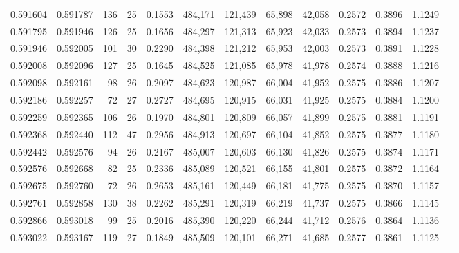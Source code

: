 \begin{tabular}{rrrrrrrrrrrrr}
0.591604 & 0.591787 & 136 &  25 &                                     0.1553 & 484,171 & 121,439 &  65,898 &  42,058 & 0.2572 & 0.3896 & 1.1249 \\
0.591795 & 0.591946 & 126 &  25 &                                     0.1656 & 484,297 & 121,313 &  65,923 &  42,033 & 0.2573 & 0.3894 & 1.1237 \\
0.591946 & 0.592005 & 101 &  30 &                                     0.2290 & 484,398 & 121,212 &  65,953 &  42,003 & 0.2573 & 0.3891 & 1.1228 \\
0.592008 & 0.592096 & 127 &  25 &                                     0.1645 & 484,525 & 121,085 &  65,978 &  41,978 & 0.2574 & 0.3888 & 1.1216 \\
0.592098 & 0.592161 &  98 &  26 &                                     0.2097 & 484,623 & 120,987 &  66,004 &  41,952 & 0.2575 & 0.3886 & 1.1207 \\
0.592186 & 0.592257 &  72 &  27 &                                     0.2727 & 484,695 & 120,915 &  66,031 &  41,925 & 0.2575 & 0.3884 & 1.1200 \\
0.592259 & 0.592365 & 106 &  26 &                                     0.1970 & 484,801 & 120,809 &  66,057 &  41,899 & 0.2575 & 0.3881 & 1.1191 \\
0.592368 & 0.592440 & 112 &  47 &                                     0.2956 & 484,913 & 120,697 &  66,104 &  41,852 & 0.2575 & 0.3877 & 1.1180 \\
0.592442 & 0.592576 &  94 &  26 &                                     0.2167 & 485,007 & 120,603 &  66,130 &  41,826 & 0.2575 & 0.3874 & 1.1171 \\
0.592576 & 0.592668 &  82 &  25 &                                     0.2336 & 485,089 & 120,521 &  66,155 &  41,801 & 0.2575 & 0.3872 & 1.1164 \\
0.592675 & 0.592760 &  72 &  26 &                                     0.2653 & 485,161 & 120,449 &  66,181 &  41,775 & 0.2575 & 0.3870 & 1.1157 \\
0.592761 & 0.592858 & 130 &  38 &                                     0.2262 & 485,291 & 120,319 &  66,219 &  41,737 & 0.2575 & 0.3866 & 1.1145 \\
0.592866 & 0.593018 &  99 &  25 &                                     0.2016 & 485,390 & 120,220 &  66,244 &  41,712 & 0.2576 & 0.3864 & 1.1136 \\
0.593022 & 0.593167 & 119 &  27 &                                     0.1849 & 485,509 & 120,101 &  66,271 &  41,685 & 0.2577 & 0.3861 & 1.1125 \\

\end{tabular}
